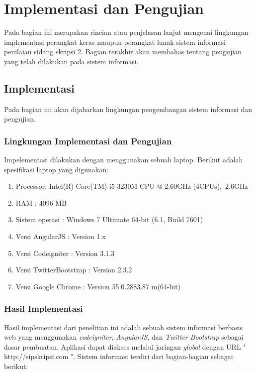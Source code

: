 \chapter{Implementasi dan Pengujian}
\label{chap: implemenPengujian}

Pada bagian ini merupakan rincian atau penjelasan lanjut mengenai lingkungan implementasi perangkat keras maupun perangkat lunak sistem informasi penilaian sidang skripsi 2. Bagian terakhir akan membahas tentang pengujian yang telah dilakukan pada sistem informasi.

\section{Implementasi}
\label{sec: implementasi}

	Pada bagian ini akan dijabarkan lingkungan pengembangan sistem informasi dan pengujian.
	
	\subsection{Lingkungan Implementasi dan Pengujian}
	\label{sub: lingkunganImp}
	
	Impelementasi dilakukan dengan menggunakan sebuah laptop. Berikut adalah spesifikasi laptop
	yang digunakan:
	
	\begin{enumerate}
		\item Processor: Intel(R) Core(TM) i5-3230M CPU @ 2.60GHz (4CPUs),~2.6GHz
		\item RAM : 4096 MB
		\item Sistem operasi : Windows 7 Ultimate 64-bit (6.1, Build 7601)
		\item Versi AngularJS : Version 1.x
		\item Versi Codeigniter : Version 3.1.3
		\item Versi TwitterBootstrap : Version 2.3.2
		\item Versi Google Chrome : Version 55.0.2883.87 m(64-bit)
	\end{enumerate}

	\subsection{Hasil Implementasi}
	\label{sub: hasilImplemen}
	
	Hasil implementasi dari penelitian ini adalah sebuah sistem informasi berbasis web yang menggunakan \textit{codeigniter}, \textit{AngularJS}, dan \textit{Twitter Bootstrap} sebagai dasar pembuatan. Aplikasi dapat diakses melalui jaringan \textit{global} dengan URL " http://sipskripsi.com ". Sistem informasi terdiri dari bagian-bagian sebagai berikut:
	
